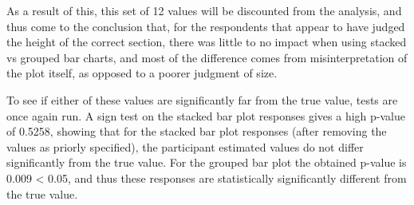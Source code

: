 \documentclass[
]{article}
\newenvironment{Shaded}{\begin{snugshade}}{\end{snugshade}}
\newcommand{\DecValTok}[1]{\textcolor[rgb]{0.00,0.00,0.81}{#1}}
\newcommand{\KeywordTok}[1]{\textcolor[rgb]{0.13,0.29,0.53}{\textbf{#1}}}
\newcommand{\NormalTok}[1]{#1}
\newcommand{\OperatorTok}[1]{\textcolor[rgb]{0.81,0.36,0.00}{\textbf{#1}}}
\newcommand{\StringTok}[1]{\textcolor[rgb]{0.31,0.60,0.02}{#1}}
\begin{document}
\begin{Shaded}
\end{Shaded}

As a result of this, this set of 12 values will be discounted from the
analysis, and thus come to the conclusion that, for the respondents that
appear to have judged the height of the correct section, there was
little to no impact when using stacked vs grouped bar charts, and most
of the difference comes from misinterpretation of the plot itself, as
opposed to a poorer judgment of size.

To see if either of these values are significantly far from the true
value, tests are once again run. A sign test on the stacked bar plot
responses gives a high p-value of 0.5258, showing that for the stacked
bar plot responses (after removing the values as priorly specified), the
participant estimated values do not differ significantly from the true
value. For the grouped bar plot the obtained p-value is 0.009
\textless{} 0.05, and thus these responses are statistically
significantly different from the true value.
\end{document}
